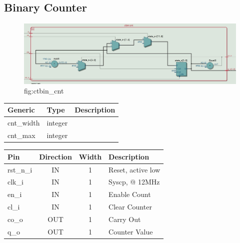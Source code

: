 \documentclass[12pt,a4 paper] {report}
\begin{document}
\subsection{Binary Counter}
\begin{figure}[h]
	\centering	
	\includegraphics[scale=0.2]{../png/ctbin_cnt.png}
	\newline
	fig:ctbin\_cnt\\
\end{figure}
\begin{center}
	\begin{tabular}{| p{2cm} | p{2cm} | p{4cm} |}
		\hline
		\textbf{Generic} & \textbf{Type} & \textbf{Description} \\
		\hline
 		cnt\_width & integer & \\
		\hline
		cnt\_max & integer & \\
		\hline
	\end{tabular}	
\end{center}

\begin{center}
	\begin{tabular}{ | p{2cm} | c | c | p{5cm} |}
		\hline
		\textbf{Pin} & \textbf{Direction} & \textbf{Width} & \textbf{Description} \\
		\hline	
 		 rst\_n\_i & IN & 1 & Reset, active low \\
 		 \hline
		clk\_i & IN & 1 & Syscp, @ 12MHz \\
		\hline
		en\_i & IN & 1 & Enable Count \\
		\hline
		cl\_i & IN & 1 & Clear Counter \\
		\hline
		co\_o & OUT & 1 & Carry Out \\
		\hline
		q\_o & OUT & 1 & Counter Value \\
		\hline
		
	\end{tabular}
\end{center}
\newpage
\end{document}
